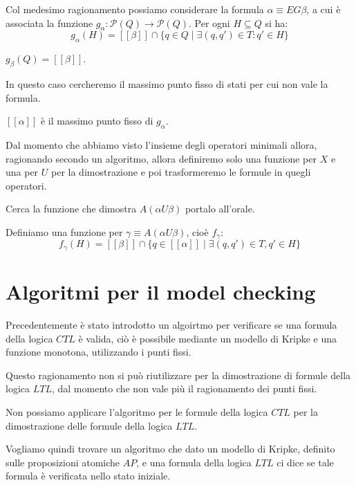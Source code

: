 Col medesimo ragionamento possiamo considerare la formula  $\alpha \equiv E G
    \beta$, a cui è associata la funzione $g_\alpha: \mathcal{P}(Q) \to \mathcal{P}(Q)$.
Per ogni $H \subseteq Q$ si ha:
\begin{equation}
    g_\alpha(H) = [[\beta]] \cap \{q \in Q \mid \exists(q, q') \in T: q ' \in H\}
\end{equation}
\begin{osservazione}
    $g_\beta (Q) = [[\beta]]$.
\end{osservazione}
In questo caso cercheremo il massimo punto fisso di stati per cui non vale la
formula.
\begin{center}
    $[[\alpha]]$ è il massimo punto fisso di $g_\alpha$.
\end{center}
Dal momento che abbiamo visto l'insieme degli operatori minimali allora,
ragionando secondo un algoritmo, allora definiremo solo una funzione per $X$ e
una per $U$ per la dimostrazione e poi trasformeremo le formule in quegli operatori.
\begin{nota}
    Cerca la funzione che dimostra $A(\alpha U \beta)$ portalo all'orale.
\end{nota}
Definiamo una funzione per $\gamma \equiv A(\alpha U \beta)$, cioè $f_\gamma$:
\begin{equation}
    f_\gamma(H) = [[\beta]] \cap \{q\in [[\alpha]] \mid \exists (q, q')\in T, q'\in H\}
\end{equation}
\section{Algoritmi per il model checking}
Precedentemente è stato introdotto un algoirtmo per verificare se una formula della
logica $CTL$ è valida, ciò è possibile mediante un modello di Kripke e una funzione
monotona, utilizzando i punti fissi.

Questo ragionamento non si può riutilizzare per la dimostrazione di formule della
logica $LTL$, dal momento che non vale più il ragionamento dei punti fissi.
\begin{nota}
    Non possiamo applicare l'algoritmo per le formule della logica $CTL$ per la
    dimostrazione delle formule della logica $LTL$.
\end{nota}
Vogliamo quindi trovare un algoritmo che dato un modello di Kripke, definito sulle
proposizioni atomiche $AP$, e una formula della logica $LTL$ ci dice se tale
formula è verificata nello stato iniziale.

